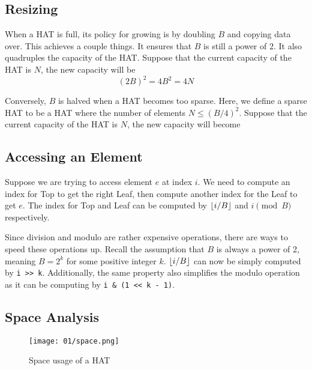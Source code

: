 \subsection*{Resizing}

\begingroup

When a HAT is full, its policy for growing is by doubling $B$ and copying data over. This achieves
a couple things. It ensures that $B$ is still a power of 2. It also quadruples the capacity of the
HAT. Suppose that the current capacity of the HAT is $N$, the new capacity will be
\[(2B)^2 = 4B^2 = 4N \]

Conversely, $B$ is halved when a HAT becomes too sparse. Here, we define a sparse HAT to be a HAT 
where the number of elements $N \leq (B/4)^2$. Suppose that the current capacity of the HAT is $N$,
the new capacity will become 

\endgroup

\subsection*{Accessing an Element}

\begingroup

Suppose we are trying to access element $e$ at index $i$. We need to compute an index for Top to get
the right Leaf, then compute another index for the Leaf to get $e$. The index for Top and Leaf can
be computed by $\lfloor i/B \rfloor$ and $i \pmod B$ respectively.

Since division and modulo are rather expensive operations, there are ways to speed these operations
up. Recall the assumption that $B$ is always a power of 2, meaning $B = 2^k$ for some
positive integer $k$. $\lfloor i/B \rfloor$ can now be simply computed by \texttt{i >> k}. 
Additionally, the same property also simplifies the modulo operation as it can be computing by
\texttt{i & (1 << k - 1)}.

\endgroup

\subsection*{Space Analysis}

\begingroup

\begin{wrapfigure}{r}{0.4\textwidth}
	\vspace*{-20pt}
	\centering
	\texttt{[image: 01/space.png]}
	\caption{Space usage of a HAT}
	\vspace*{-20pt}
\end{wrapfigure}

